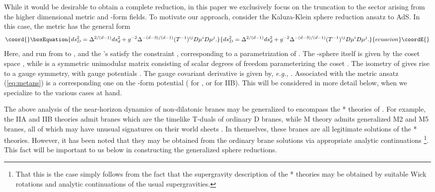 \documentclass[a4paper,12pt]{article}
\providecommand{\fft}[2]{{\frac{#1}{#2}}}
\begin{document}
While it would be desirable to obtain a complete reduction, in this
paper we exclusively focus on the truncation to the sector arising from
the higher dimensional metric and \coordHE{}-form fields.  To motivate our
approach, consider the Kaluza-Klein sphere reduction ansatz to
AdS\coordHE{}.  In this case, the metric has the
general form \cite{Cvetic:1999xx,Cvetic:2000eb,Cvetic2}
%
\begin{equation}\coord{}\boxEquation{
ds_D^2=\Delta^{2/(d-1)}ds_d^2+g^{-2}\Delta^{-(d-3)/(d-1)}(T^{-1})^{ij}
D\mu^iD\mu^j.
\label{eq:metans}
}{
ds_D^2=\Delta^{2/(d-1)}ds_d^2+g^{-2}\Delta^{-(d-3)/(d-1)}(T^{-1})^{ij}
D\mu^iD\mu^j.
}{ecuacion}\coordE{}\end{equation}
%
Here, \coordHE{} and \coordHE{} run from \coordHE{} to \coordHE{}, and the \coordHE{}'s satisfy
the constraint \coordHE{}, corresponding to a parametrization
of \coordHE{}.  The \coordHE{}-sphere itself is given by the coset space
\coordHE{}, while \coordHE{} is a symmetric unimodular matrix
consisting of \myHighlight{$\fft12n(n+3)$}\coordHE{} scalar degrees of freedom parameterizing the
coset \coordHE{}.  The isometry of \coordHE{} gives rise to a
\coordHE{} gauge symmetry, with gauge potentials \coordHE{}.  The
gauge covariant derivative is given by, {\it e.g.},
\coordHE{}.  Associated with the metric ansatz
(\ref{eq:metans}) is a corresponding one on the \coordHE{}-form potential
(\coordHE{} for \coordHE{}, or \coordHE{} for IIB).  This will be considered in
more detail below, when we specialize to the various cases at hand.

The above analysis of the near-horizon dynamics of non-dilatonic branes
may be generalized to encompass the * theories of \cite{Hull:1998vg,Hull2}.
For example, the IIA\myHighlight{$^*$}\coordHE{} and IIB\myHighlight{$^*$}\coordHE{} theories admit branes which are the
timelike T-duals of ordinary D branes, while M\myHighlight{$^*$}\coordHE{} theory admits
generalized M2 and M5 branes, all of which may have unusual signatures
on their world sheets \cite{Hull3,Hull4}.  In themselves, these branes
are all legitimate solutions of the * theories.  However, it has been
noted that they may be obtained from the ordinary brane solutions via
appropriate analytic continuations%
%
\footnote{That this is the case simply follows from the fact that the
supergravity description of the * theories may be obtained by suitable
Wick rotations and analytic continuations of the usual supergravities.}.
%
This fact will be important to us below in constructing the generalized
sphere reductions.
\end{document}
